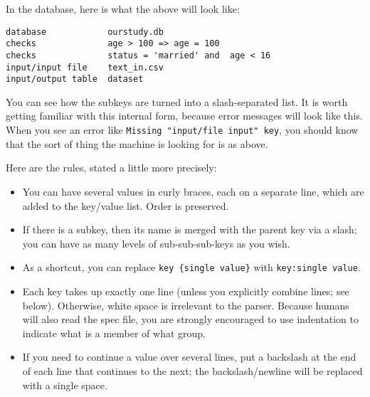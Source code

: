 \documentclass{article}
\begin{document}
In the database, here is what the above will look like:
\begin{verbatim}
database            ourstudy.db
checks              age > 100 => age = 100
checks              status = 'married' and  age < 16
input/input file    text_in.csv
input/output table  dataset
\end{verbatim}
You can see how the subkeys are turned into a slash-separated list. It is worth getting
familiar with this internal form, because error messages will look like this. When you
see an error like {\tt Missing "input/file input" key}, you should know that the sort of
thing the machine is looking for is as above.

Here are the rules, stated a little more precisely:
\begin{itemize}
\item You can have several values in curly braces, each on a separate line, which are added to the key/value list. Order is preserved.
\item If there is a subkey, then its name is merged with the parent key via a slash;
you can have as many levels of sub-sub-sub-keys as you wish. 
\item As a shortcut, you can replace {\tt key \{single value\}} with {\tt key:single value}. 
\item Each key takes up exactly one line (unless you explicitly combine lines; see below). Otherwise, white
space is irrelevant to the parser. Because humans will also read the spec file, you
are strongly encouraged to use indentation to indicate what is a member of what group.
\item If you need to continue a value over several lines, put a backslash at the end of
each line that continues to the next; the backslash/newline will be replaced with a single space.
\end{itemize}
\end{document}

